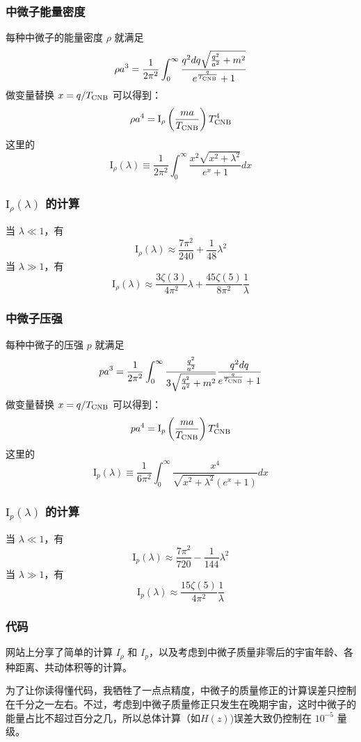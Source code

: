 \documentclass[CJK,13pt]{beamer}
\begin{document}
  \begin{frame}
    \frametitle{中微子能量密度}
    每种中微子的能量密度 $\rho$ 就满足
    $$\rho a^3 = \frac{1}{2\pi^2}\int_0^\infty \frac{q^2dq\sqrt{\frac{q^2}{a^2}+m^2}}{e^{\frac{q}{T_{\rm CNB}}}+1}$$    
    做变量替换 $x = q/T_{\rm CNB}$ 可以得到：
    $$\rho a^4 = \mathrm{I}_\rho\left(\frac{ma}{T_{\rm CNB}}\right) T^4_{\rm CNB} $$
    这里的
    $$ \mathrm{I}_\rho(\lambda) \equiv  \frac{1}{2\pi^2}\int_0^\infty \frac{x^2\sqrt{x^2+\lambda^2}}{e^x+1}dx$$    
  \end{frame}

  \begin{frame}
    \frametitle{$\mathrm{I}_\rho(\lambda)$ 的计算}
    当 $\lambda \ll 1$，有
    $$ \mathrm{I}_\rho(\lambda) \approx \frac{7\pi^2}{240} + \frac{1}{48}\lambda^2 $$
    当 $\lambda \gg 1$，有
    $$ \mathrm{I}_\rho(\lambda) \approx \frac{3\zeta(3)}{4\pi^2}\lambda + \frac{45\zeta(5)}{8\pi^2}\frac{1}{\lambda} $$ %
  \end{frame}


  \begin{frame}
    \frametitle{中微子压强}
    每种中微子的压强 $p$ 就满足
    $$pa^3  = \frac{1}{2\pi^2}\int_0^\infty \frac{\frac{q^2}{a^2}}{3\sqrt{\frac{q^2}{a^2}+m^2}}\frac{q^2dq}{e^{\frac{q}{T_{\rm CNB}}}+1}$$    
    做变量替换 $x = q/T_{\rm CNB}$ 可以得到：
    $$ pa^4 = \mathrm{I}_p\left(\frac{ma}{T_{\rm CNB}}\right) T^4_{\rm CNB} $$
    这里的
    $$ \mathrm{I}_p(\lambda) \equiv  \frac{1}{6\pi^2}\int_0^\infty \frac{x^4}{\sqrt{x^2+\lambda^2}\left(e^x+1\right)}dx$$    
  \end{frame}

  \begin{frame}
    \frametitle{$\mathrm{I}_p(\lambda)$ 的计算}
    当 $\lambda \ll 1$，有
    $$ \mathrm{I}_p(\lambda) \approx \frac{7\pi^2}{720} - \frac{1}{144}\lambda^2 $$
    当 $\lambda \gg 1$，有
    $$ \mathrm{I}_p(\lambda) \approx \frac{15\zeta(5)}{4\pi^2}\frac{1}{\lambda} $$ %

  \end{frame}


  \begin{frame}
    \frametitle{代码}
    网站上分享了简单的计算 $I_\rho$ 和 $I_p$，以及考虑到中微子质量非零后的宇宙年龄、各种距离、共动体积等的计算。


    为了让你读得懂代码，我牺牲了一点点精度，中微子的质量修正的计算误差只控制在千分之一左右。不过，考虑到中微子质量修正只发生在晚期宇宙，这时中微子的能量占比不超过百分之几，所以总体计算（如$H(z)$)误差大致仍控制在 $10^{-5}$ 量级。
  \end{frame}
  
  
    \ech
\end{document}
